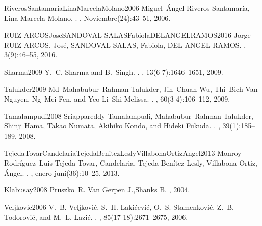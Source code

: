 \begin{description}
\item{RiverosSantamariaLinaMarcelaMolano2006}
Miguel~{\'{A}}ngel {Riveros Santamar{\'{i}}a, Lina Marcela Molano}.
.
, Noviembre(24):43--51, 2006.

\item{RUIZ-ARCOSJoseSANDOVAL-SALASFabiolaDELANGELRAMOS2016}
Jorge {RUIZ-ARCOS, Jos{\'{e}}, SANDOVAL-SALAS, Fabiola, DEL ANGEL RAMOS}.
, 3(9):46--55,
2016.

\item{Sharma2009}
Y.~C. Sharma and B.~Singh.
.
, 13(6-7):1646--1651, 2009.

\item{Talukder2009}
Md~Mahabubur~Rahman Talukder, Jin~Chuan Wu, Thi~Bich {Van Nguyen}, Ng~Mei Fen,
and Yeo Li~Shi Melissa.
.
, 60(3-4):106--112, 2009.

\item{Tamalampudi2008}
Sriappareddy Tamalampudi, Mahabubur~Rahman Talukder, Shinji Hama, Takao Numata,
Akihiko Kondo, and Hideki Fukuda.
.
, 39(1):185--189, 2008.

\item{TejedaTovarCandelariaTejedaBenitezLeslyVillabonaOrtizAngel2013}
Monroy Rodr{\'{i}}guez~Luis {Tejeda Tovar, Candelaria, Tejeda Ben{\'{i}}tez
	Lesly, Villabona Ortiz, {\'{A}}ngel}.
.
, enero-juni(36):10--25, 2013.

\item{Klabusay2008}
Pruszko~R. {Van Gerpen J.,Shanks B.}
, 2004.

\item{Veljkovic2006}
V.~B. Veljkovi{\'{c}}, S.~H. Laki{\'{c}}evi{\'{c}}, O.~S. Stamenkovi{\'{c}},
Z.~B. Todorovi{\'{c}}, and M.~L. Lazi{\'{c}}.
.
, 85(17-18):2671--2675, 2006.


\end{description}
